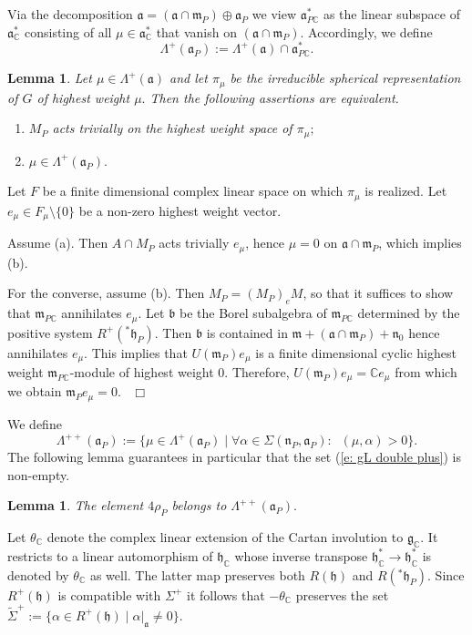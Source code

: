 \documentclass[12pt,a4paper]{article}
\newtheorem{Lemma}[Thm]{Lemma}
\newenvironment{lemma}[0]{\begin{Lemma}\noindent}%
{\end{Lemma}}
\def\proof{\par\noindent{\it Proof.}{\ }{\ }}
\def\qed{~\hfill\hbox{$\Box$}\medbreak}
\def\itema{\vspace{-1mm}\item[{\rm (a)}]}
\def\itemb{\item[{\rm (b)}]}
\def\msy#1{{\mathbb #1}}
\def\C{{\msy C}}
\def\ga{\alpha}
\def\gS{\Sigma}
\def\got#1{\mathfrak #1}
\def\fa{{\got a}}
\def\fb{{\got b}}
\def\fg{{\got g}}
\def\fh{{\got h}}
\def\fm{{\got m}}
\def\fn{{\got n}}
\def\to{\rightarrow}
\def\iC{{\scriptscriptstyle \C}}
\numberwithin{Thm}{section}
\numberwithin{equation}{section}
\def\fadc{\fa_\C^*}
\def\faPdc{{\fa_{P\iC}^*}}
\def\gL{\Lambda}
\def\Cartan{\theta}
\numberwithin{equation}{section}
\def\gL{\Lambda}
\def\faPdc{\fa_{P\iC}^*}
\def\fh{{\mathfrak h}}
\def\Cartan{\theta}
\def\Rinp#1#2{(#1,#2)}
\begin{document}
Via the decomposition $\fa = (\fa \cap \fm_P) \oplus \fa_P$ we view 
$\faPdc$ as the linear subspace of $\fadc$ consisting of all 
$\mu \in \fadc$ that  vanish on $(\fa \cap \fm_P).$  Accordingly, we define
$$ 
\gL^+(\fa_P):= \gL^+(\fa) \cap \faPdc. 
$$ 


\begin{lemma}
\label{l: star A on hw}
Let $\mu \in \gL^+(\fa)$ and let $\pi_\mu$ be the irreducible spherical representation of $G$ of highest weight $\mu.$ Then the following assertions are equivalent.
\begin{enumerate}
\itema $M_P$ acts trivially on the highest weight space of $\pi_\mu;$ 
\itemb $\mu \in \gL^+(\fa_P).$ 
\end{enumerate}
\end{lemma}

\proof
Let $F$ be a finite dimensional complex linear space on which $\pi_\mu$ is realized. Let $e_\mu \in F_\mu \setminus \{0\}$ be a non-zero highest weight vector.

Assume (a). Then $A \cap M_P$ acts trivially $e_\mu$, hence $\mu = 0 $ on $\fa \cap \fm_P$, which implies (b). 

For the converse, assume (b). Then $M_P = (M_P)_e M$, so that it suffices to show that $\fm_{P\iC}$ annihilates $e_\mu.$ Let $\fb$ be the Borel subalgebra of $\fm_{P\iC}$ determined by the positive system $R^+({}^*\fh_P).$ 
Then $\fb$ is contained in $ \fm +  (\fa \cap \fm_P) + \fn_0$ hence annihilates $e_\mu.$ 
This implies that $U(\fm_P) e_\mu$ is a finite dimensional cyclic highest weight $\fm_{P\iC}$-module of highest weight $0.$
Therefore, $U(\fm_P) e_\mu = \C e_\mu$ from which we obtain $\fm_P e_\mu = 0.$ 
\qed

We define 
\begin{equation}
\label{e: gL double plus}
\gL^{++}(\fa_P):= \{ \mu \in \gL^+(\fa_P)\mid \forall \ga \in \gS(\fn_P, \fa_P):\;\;  
\Rinp{\mu}{\ga} > 0\}.
\end{equation} 
The following lemma guarantees in particular that the set (\ref{e: gL double plus}) is 
non-empty.
\begin{lemma} 
\label{l: property 4 rho P}
The element $4 \rho_P$ belongs to $\gL^{++}(\fa_P).$
\end{lemma}
\proof 
Let $\Cartan_\iC$ denote the complex linear extension of the Cartan involution to 
$\fg_\iC.$ It restricts to a linear automorphism of  $\fh_\iC$ whose 
inverse transpose $\fh_\iC^* \to \fh_\iC^*$ is denoted by $\Cartan_\iC$ as well.
The latter map preserves both $R(\fh)$ and $R({}^*\fh_P).$  Since $R^+(\fh)$ 
is compatible with $\gS^+$ it follows that $-\Cartan_\C$ preserves 
the set $\widetilde \gS^+:= \{\ga \in R^+(\fh) \mid \ga|_\fa \neq 0\}.$  
\end{document}
